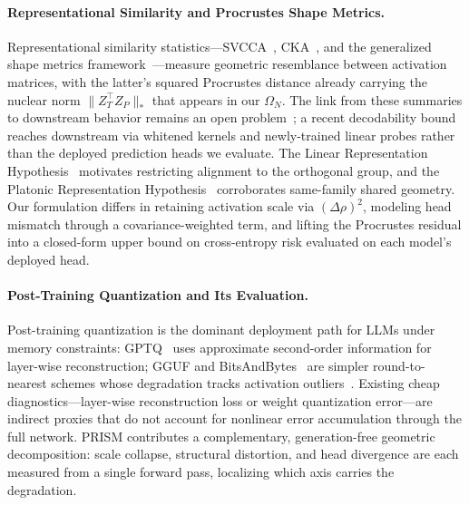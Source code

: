 \documentclass{article}
\begin{document}
\paragraph{Representational Similarity and Procrustes Shape Metrics.}
Representational similarity statistics---SVCCA~\cite{raghu2017svcca}, CKA~\cite{kornblith2019similarity}, and the generalized shape metrics framework~\cite{williams2021generalized}---measure geometric resemblance between activation matrices, with the latter's squared Procrustes distance already carrying the nuclear norm $\|Z_T^\top Z_P\|_*$ that appears in our $\Omega_N$. The link from these summaries to downstream behavior remains an open problem~\cite{ding2021grounding, davari2023reliability, klabunde2023similarity}; a recent decodability bound~\cite{harvey2024what} reaches downstream via whitened kernels and newly-trained linear probes rather than the deployed prediction heads we evaluate. The Linear Representation Hypothesis~\cite{moschella2022relative, park2023linear} motivates restricting alignment to the orthogonal group, and the Platonic Representation Hypothesis~\cite{huh2024platonic} corroborates same-family shared geometry. Our formulation differs in retaining activation scale via $(\Delta\rho)^2$, modeling head mismatch through a covariance-weighted term, and lifting the Procrustes residual into a closed-form upper bound on cross-entropy risk evaluated on each model's deployed head.

\paragraph{Post-Training Quantization and Its Evaluation.}
Post-training quantization is the dominant deployment path for LLMs under memory constraints: GPTQ~\cite{frantar2022gptq} uses approximate second-order information for layer-wise reconstruction; GGUF and BitsAndBytes~\cite{dettmers2022gpt3} are simpler round-to-nearest schemes whose degradation tracks activation outliers~\cite{xiao2023smoothquant}. Existing cheap diagnostics---layer-wise reconstruction loss or weight quantization error---are indirect proxies that do not account for nonlinear error accumulation through the full network. PRISM contributes a complementary, generation-free geometric decomposition: scale collapse, structural distortion, and head divergence are each measured from a single forward pass, localizing which axis carries the degradation.
\end{document}
